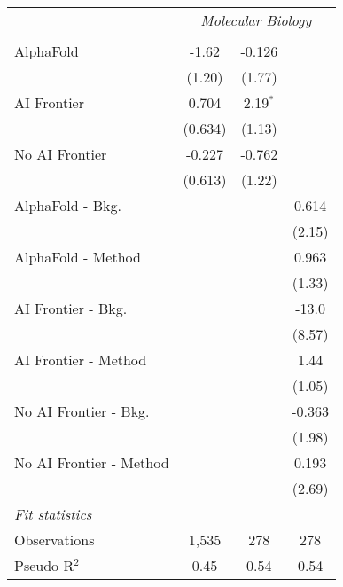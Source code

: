 \begin{tabular}{lccc}
 & \multicolumn{3}{c}{\textit{Molecular Biology}} \\ \\
   AlphaFold               & -1.62   & -0.126     &   \\   
                           & (1.20)  & (1.77)     &   \\   
   AI Frontier             & 0.704   & 2.19$^{*}$ &   \\   
                           & (0.634) & (1.13)     &   \\   
   No AI Frontier          & -0.227  & -0.762     &   \\   
                           & (0.613) & (1.22)     &   \\   
   AlphaFold - Bkg.        &         &            & 0.614\\   
                           &         &            & (2.15)\\   
   AlphaFold - Method      &         &            & 0.963\\   
                           &         &            & (1.33)\\   
   AI Frontier - Bkg.      &         &            & -13.0\\   
                           &         &            & (8.57)\\   
   AI Frontier - Method    &         &            & 1.44\\   
                           &         &            & (1.05)\\   
   No AI Frontier - Bkg.   &         &            & -0.363\\   
                           &         &            & (1.98)\\   
   No AI Frontier - Method &         &            & 0.193\\   
                           &         &            & (2.69)\\   
   \midrule
   \emph{Fit statistics}\\
   Observations            & 1,535   & 278        & 278\\  
   Pseudo R$^2$            & 0.45    & 0.54       & 0.54\\  
   

\end{tabular}
